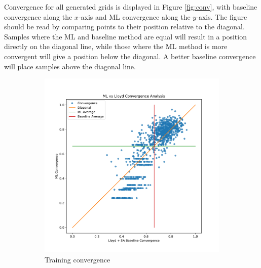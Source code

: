 \documentclass{article}
\begin{document}
Convergence for all generated grids is displayed in Figure \ref{fig:conv}, with baseline convergence along the $x$-axis and ML convergence along the $y$-axis.  The figure should be read by comparing points to their position relative to the diagonal.  Samples where the ML and baseline method are equal will result in a position directly on the diagonal line, while those where the ML method is more convergent will give a position below the diagonal.  A better baseline convergence will place samples above the diagonal line.
\begin{figure}[h]
  \centering
  \begin{subfigure}[t]{0.49\textwidth}
    \centering
    \includegraphics[width=\textwidth]{train_convergence.pdf}
    \caption{Training convergence}
  \end{subfigure}
  \begin{subfigure}[t]{0.49\textwidth}
    \centering

\end{subfigure}
\end{figure}
\end{document}
